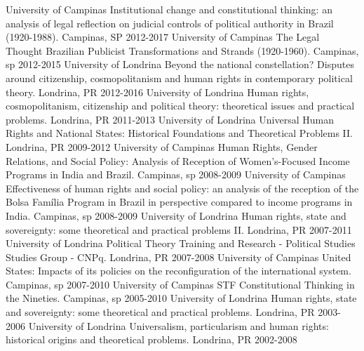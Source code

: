 \begin{cvhonors}
  \cvprohonor
    {University of Campinas}
    {Institutional change and constitutional thinking: an analysis of legal reflection on judicial controls of political authority in Brazil (1920-1988).}
    {Campinas, SP}
    {2012-2017}
  \cvprohonor
    {University of Campinas}
    {The Legal Thought Brazilian Publicist Transformations and Strands (1920-1960).}
    {Campinas, sp}
    {2012-2015}
  \cvprohonor
    {University of Londrina}
    {Beyond the national constellation? Disputes around citizenship, cosmopolitanism and human rights in contemporary political theory.}
    {Londrina, PR}
    {2012-2016}
  \cvprohonor
    {University of Londrina}
    {Human rights, cosmopolitanism, citizenship and political theory: theoretical issues and practical problems.}
    {Londrina, PR}
    {2011-2013}
  \cvprohonor
    {University of Londrina}
    {Universal Human Rights and National States: Historical Foundations and Theoretical Problems II.}
    {Londrina, PR}
    {2009-2012}
  \cvprohonor
    {University of Campinas}
    {Human Rights, Gender Relations, and Social Policy: Analysis of Reception of Women's-Focused Income Programs in India and Brazil.}
    {Campinas, sp}
    {2008-2009}
  \cvprohonor
    {University of Campinas}
    {Effectiveness of human rights and social policy: an analysis of the reception of the Bolsa Família Program in Brazil in perspective compared to income programs in India.}
    {Campinas, sp}
    {2008-2009}
  \cvprohonor
    {University of Londrina}
    {Human rights, state and sovereignty: some theoretical and practical problems II.}
    {Londrina, PR}
    {2007-2011}
  \cvprohonor
    {University of Londrina}
    {Political Theory Training and Research - Political Studies Studies Group - CNPq.}
    {Londrina, PR}
    {2007-2008}
  \cvprohonor
    {University of Campinas}
    {United States: Impacts of its policies on the reconfiguration of the international system.}
    {Campinas, sp}
    {2007-2010}
  \cvprohonor
    {University of Campinas}
    {STF Constitutional Thinking in the Nineties.}
    {Campinas, sp}
    {2005-2010}
  \cvprohonor
    {University of Londrina}
    {Human rights, state and sovereignty: some theoretical and practical problems.}
    {Londrina, PR}
    {2003-2006}
  \cvprohonor
    {University of Londrina}
    {Universalism, particularism and human rights: historical origins and theoretical problems.}
    {Londrina, PR}
    {2002-2008}
\end{cvhonors}
